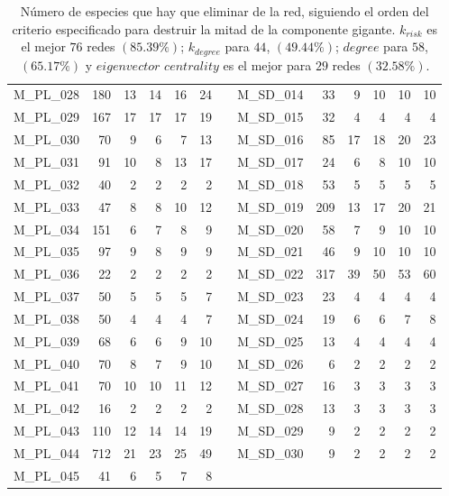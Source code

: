 \begin{table}[htbp]
\begin{tabular}{lrrrrrrrrrrrr}
    M\_PL\_028 & 180  & 13   & 14   & 16   & 24   &      & M\_SD\_014 & 33   & 9    & 10   & 10   & 10 \\
    M\_PL\_029 & 167  & 17   & 17   & 17   & 19   &      & M\_SD\_015 & 32   & 4    & 4    & 4    & 4 \\
    M\_PL\_030 & 70   & 9    & 6    & 7    & 13   &      & M\_SD\_016 & 85   & 17   & 18   & 20   & 23 \\
    M\_PL\_031 & 91   & 10   & 8    & 13   & 17   &      & M\_SD\_017 & 24   & 6    & 8    & 10   & 10 \\
    M\_PL\_032 & 40   & 2    & 2    & 2    & 2    &      & M\_SD\_018 & 53   & 5    & 5    & 5    & 5 \\
    M\_PL\_033 & 47   & 8    & 8    & 10   & 12   &      & M\_SD\_019 & 209  & 13   & 17   & 20   & 21 \\
    M\_PL\_034 & 151  & 6    & 7    & 8    & 9    &      & M\_SD\_020 & 58   & 7    & 9    & 10   & 10 \\
    M\_PL\_035 & 97   & 9    & 8    & 9    & 9    &      & M\_SD\_021 & 46   & 9    & 10   & 10   & 10 \\
    M\_PL\_036 & 22   & 2    & 2    & 2    & 2    &      & M\_SD\_022 & 317  & 39   & 50   & 53   & 60 \\
    M\_PL\_037 & 50   & 5    & 5    & 5    & 7    &      & M\_SD\_023 & 23   & 4    & 4    & 4    & 4 \\
    M\_PL\_038 & 50   & 4    & 4    & 4    & 7    &      & M\_SD\_024 & 19   & 6    & 6    & 7    & 8 \\
    M\_PL\_039 & 68   & 6    & 6    & 9    & 10   &      & M\_SD\_025 & 13   & 4    & 4    & 4    & 4 \\
    M\_PL\_040 & 70   & 8    & 7    & 9    & 10   &      & M\_SD\_026 & 6    & 2    & 2    & 2    & 2 \\
    M\_PL\_041 & 70   & 10   & 10   & 11   & 12   &      & M\_SD\_027 & 16   & 3    & 3    & 3    & 3 \\
    M\_PL\_042 & 16   & 2    & 2    & 2    & 2    &      & M\_SD\_028 & 13   & 3    & 3    & 3    & 3 \\
    M\_PL\_043 & 110  & 12   & 14   & 14   & 19   &      & M\_SD\_029 & 9    & 2    & 2    & 2    & 2 \\
    M\_PL\_044 & 712  & 21   & 23   & 25   & 49   &      & M\_SD\_030 & 9    & 2    & 2    & 2    & 2 \\
    M\_PL\_045 & 41   & 6    & 5    & 7    & 8    &      &      &      &      &      &      &  \\
    \bottomrule
    \end{tabular}%
    \caption{\label{table:DEST_halfgc_destruction} Número de especies que hay que eliminar de la red, siguiendo el orden del criterio especificado para destruir la mitad de la componente gigante. $k_{risk}$ es el mejor $76$ redes $(85.39\%)$; $k_{degree}$ para $44$, $(49.44\%)$; $degree$ para $58$, $(65.17\%)$ y
$eigenvector$ $centrality$ es el mejor para $29$ redes $(32.58\%)$.}


\end{table}
